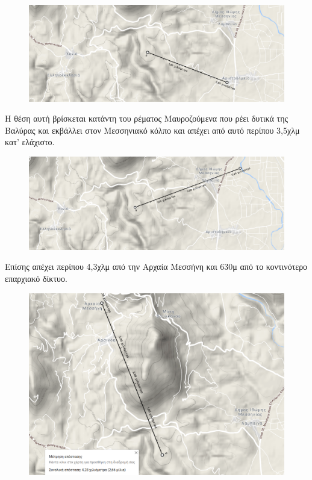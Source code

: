 \documentclass[12pt]{article}
\begin{document}
 	\begin{figure} [H]
 		\begin{center}
 			\includegraphics [scale = 0.45] {map45.png}
 		\end{center}
 	\end{figure}
 
 	Η θέση αυτή βρίσκεται κατάντη του ρέματος Μαυροζούμενα που ρέει δυτικά της Βαλύρας και εκβάλλει στον Μεσσηνιακό κόλπο και απέχει από αυτό περίπου 3,5χλμ κατ’ ελάχιστο.
 	
 	\begin{figure} [H]
 		\begin{center}
 			\includegraphics [scale = 0.45] {map46.png}
 		\end{center}
 	\end{figure}
 	
 	Επίσης απέχει περίπου 4,3χλμ από την Αρχαία Μεσσήνη και 630μ από το κοντινότερο επαρχιακό δίκτυο.
 	
 	\begin{figure} [H]
 		\begin{center}
 			\includegraphics [scale = 0.30] {map47.png}
 		\end{center}
 	\end{figure}
 
\end{document}
